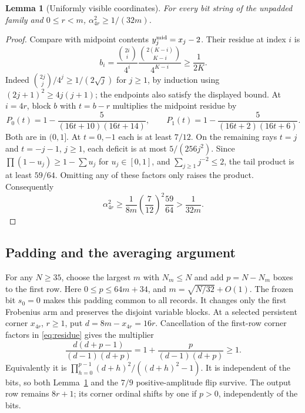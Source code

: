 \documentclass[11pt]{article}
\newtheorem{lemma}[theorem]{Lemma}
\theoremstyle{definition}
\begin{document}
\begin{lemma}[Uniformly visible coordinates]\label{lem:mass}
For every bit string of the unpadded family and $0\le r<m$,
$\alpha_{4r}^2\ge1/(32m)$.
\end{lemma}
\begin{proof}
Compare with midpoint contents $y_j^{\rm mid}=x_j-2$. Their residue at
index $i$ is
\[
 b_i=\frac{\binom{2i}{i}}{4^i}
      \frac{\binom{2(K-i)}{K-i}}{4^{K-i}}\ge\frac1{2K}.
\]
Indeed $\binom{2j}{j}/4^j\ge1/(2\sqrt j)$ for $j\ge1$, by induction
using $(2j+1)^2\ge4j(j+1)$; the endpoints also satisfy the displayed bound.
At $i=4r$, block $b$ with $t=b-r$ multiplies the midpoint residue by
\[
 P_0(t)=1-\frac5{(16t+10)(16t+14)},\qquad
 P_1(t)=1-\frac5{(16t+2)(16t+6)}.
\]
Both are in $(0,1]$. At $t=0,-1$ each is at least $7/12$. On the
remaining rays $t=j$ and $t=-j-1$, $j\ge1$, each deficit is at most
$5/(256j^2)$. Since $\prod(1-u_j)\ge1-\sum u_j$ for $u_j\in[0,1]$,
and $\sum_{j\ge1}j^{-2}\le2$, the tail product is at least $59/64$.
Omitting any of these factors only raises the product. Consequently
\[
 \alpha_{4r}^2\ge\frac1{8m}\left(\frac7{12}\right)^2\frac{59}{64}
 >\frac1{32m}.
\]
\end{proof}

\subsection{Padding and the averaging argument}

For any $N\ge35$, choose the largest $m$ with $N_m\le N$ and add
$p=N-N_m$ boxes to the first row. Here $0\le p\le64m+34$, and
$m=\sqrt{N/32}+O(1)$. The frozen bit $s_0=0$ makes this padding common
to all records. It changes only the first Frobenius arm and preserves
the disjoint variable blocks. At a selected persistent corner $x_{4r}$,
$r\ge1$, put $d=8m-x_{4r}=16r$. Cancellation of the first-row corner
factors in \eqref{eq:residue} gives the multiplier
\begin{equation}\label{eq:pad}
 \frac{d(d+p-1)}{(d-1)(d+p)}
 =1+\frac{p}{(d-1)(d+p)}\ge1.
\end{equation}
Equivalently it is $\prod_{h=0}^{p-1}(d+h)^2/((d+h)^2-1)$.
It is independent of the bits, so both Lemma~\ref{lem:mass} and the
$7/9$ positive-amplitude flip survive. The output row remains $8r+1$;
its corner ordinal shifts by one if $p>0$, independently of the bits.
\end{document}
